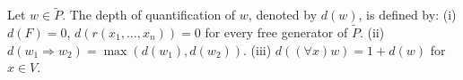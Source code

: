 Let $w \in \tilde{P}$. The depth of quantification of $w$, denoted by $d(w)$, is defined by:
(i) $d(F) = 0$, $d(r(x_1, \ldots, x_n)) = 0$ for every free generator of $\tilde{P}$.
(ii) $d(w_1 \Rightarrow w_2) = \max(d(w_1), d(w_2))$.
(iii) $d((\forall x)w) = 1 + d(w)$ for $x \in V$.
